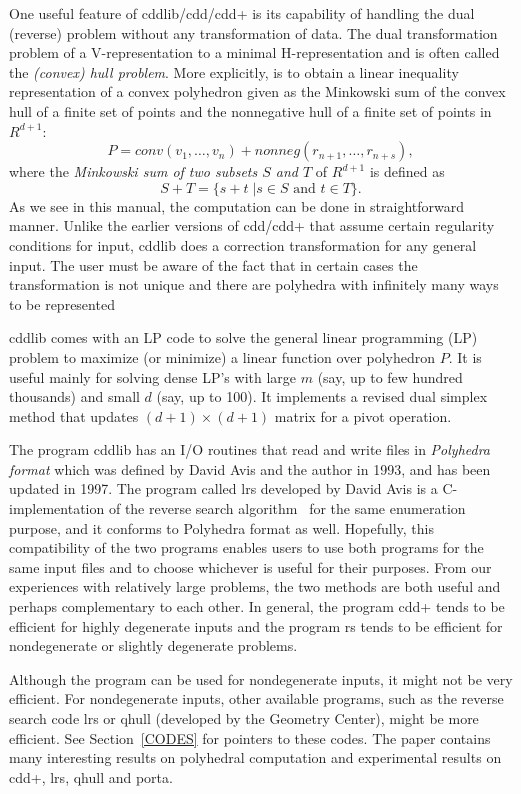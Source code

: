 \documentclass[11pt]{article}
\newcommand {\0} {{\bf 0}}
\begin{document}
One useful feature of  cddlib/cdd/cdd+ is its capability
of handling the dual (reverse)  problem without any transformation
of data.  The dual transformation problem of a V-representation
to a minimal H-representation and is often called the 
{\em (convex) hull problem\/}.  More explicitly,
is to obtain a linear inequality representation
of a convex polyhedron given as the Minkowski sum of 
the convex hull of a finite set of points and the nonnegative
hull of a finite set of points in $R^{d+1}$: 
\[
P = conv(v_1,\ldots,v_n) +  nonneg(r_{n+1},\ldots,r_{n+s}), 
\]
where
 the {\em Minkowski sum of two subsets $S$ and $T$} of $R^{d+1}$ is defined
as 
\[
S + T = \{ s + t \; |  s \in S \mbox{ and } t \in T \}.
\]
As we see in this manual, the computation can be done
in straightforward manner.  Unlike the earlier versions of
cdd/cdd+ that assume certain regularity conditions for input, 
cddlib does a correction transformation for any general input.
The user must be aware of the fact that in certain cases the
transformation is not unique and there are polyhedra with
infinitely many ways to be represented 

cddlib comes with an LP code to solve the general
linear programming (LP) problem to maximize (or minimize) a linear
function over polyhedron $P$.   It is useful mainly for solving 
dense LP's with large $m$ (say, up to few hundred thousands) and small $d$ 
(say, up to 100).  It implements a revised dual simplex method that
updates $(d+1)\times (d+1)$ matrix for a pivot operation.

The program cddlib has an I/O routines that read and write files in 
{\em Polyhedra format\/} which was defined by David Avis and
the author in 1993, and has been updated in 1997.  
The program called lrs \cite{a-uglrs-97} developed by David Avis is
a C-implementation of the reverse search algorithm~\cite{af-pachv-92} 
for the same enumeration purpose, and it conforms to Polyhedra format as well.
Hopefully, this compatibility of the two programs
enables users to use both programs for the same input files
and to choose whichever is useful for their purposes.
From our experiences with relatively large problems,
the two methods are both useful and perhaps complementary
to each other.  In general, the program cdd+ tends to be
efficient for highly degenerate inputs and the program rs
tends to be efficient for nondegenerate or slightly
degenerate problems.

Although the program can be used for nondegenerate inputs,
it might not be very efficient.  For nondegenerate inputs, 
other available programs, such as the reverse search code lrs or
qhull (developed by the Geometry Center),
might be more efficient.  See Section~\ref{CODES} 
for pointers to these codes.  
The paper \cite{abs-hgach-97} contains many interesting results on polyhedral
computation and experimental results on cdd+, lrs, qhull and porta.
\end{document}
